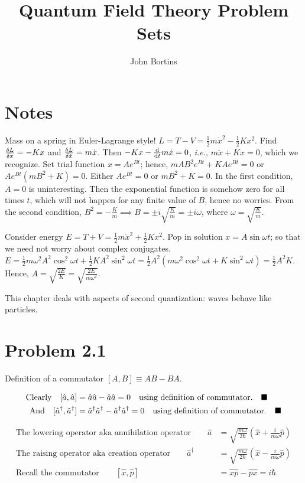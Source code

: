 \documentclass{amsart}
\title{Quantum Field Theory Problem Sets}
\author{John Bortins}
\begin{document}
 
\maketitle{}

\section*{Notes}

Mass on a spring in Euler-Lagrange style! $L=T-V=\frac{1}{2}m\dot{x}^2-\frac{1}{2}Kx^2$. Find $\fdv{L}{x}=-Kx$ and $\fdv{L}{\dot{x}}=m\dot{x}$. Then $-Kx-\dv{t}m\dot{x}=0$, \emph{i.e.}, $m\ddot{x}+Kx=0$, which we recognize. Set trial function $x=Ae^{Bt}$; hence, $mAB^2 e^{Bt}+KAe^{Bt}=0$ or $Ae^{Bt}(mB^2+K)=0$. Either $Ae^{Bt}=0$ or $mB^2+K=0$. In the first condition, $A=0$ is uninteresting. Then the exponential function is somehow zero for all times $t$, which will not happen for any finite value of $B$, hence no worries. From the second condition, $B^2=-\frac{K}{m}\implies B=\pm i\sqrt{\frac{K}{m}}=\pm i\omega$, where $\omega=\sqrt{\frac{K}{m}}$.

Consider energy $E=T+V=\frac{1}{2}m\dot{x}^2+\frac{1}{2}Kx^2$. Pop in solution $x=A\sin{\omega t}$; so that we need not worry about complex conjugates. $E=\frac{1}{2}m\omega^2 A^2 \cos^2 {\omega t}+\frac{1}{2}KA^2 \sin^2 {\omega t}=\frac{1}{2}A^2 (m\omega^2 \cos^2 {\omega t}+K\sin^2 {\omega t})=\frac{1}{2}A^2 K$. Hence, $A=\sqrt{\frac{2E}{K}}=\sqrt{\frac{2E}{m\omega^2}}$.

This chapter deals with aspects of second quantization: waves behave like particles.

\section*{Problem 2.1}

Definition of a commutator $[A,B]\equiv AB-BA$.

\begin{align*}
    \qq*{Clearly} [\hat{a},\hat{a}]  &= \hat{a}\hat{a}-\hat{a}\hat{a}=0\qq{using definition of commutator.}\blacksquare \\
    \qq*{And} [\hat{a}^\dagger,\hat{a}^\dagger]  &= \hat{a}^\dagger\hat{a}^\dagger-\hat{a}^\dagger\hat{a}^\dagger=0\qq{using definition of commutator.}\blacksquare 
\end{align*}

\begin{align*}
    \text{The lowering operator aka annihilation operator}\qquad\hat{a}  &= \sqrt{\frac{m\omega}{2\hbar}}\left(\hat{x} + \frac{i}{m\omega}\hat{p}\right) \\
    \text{The raising operator aka creation operator}\qquad\hat{a}^\dagger  &= \sqrt{\frac{m\omega}{2\hbar}}\left(\hat{x} - \frac{i}{m\omega}\hat{p}\right)\\
    \text{Recall the commutator}\qquad[\hat{x},\hat{p}]  &= \hat{x}\hat{p}-\hat{p}\hat{x}=i\hbar
\end{align*}
\end{document}
